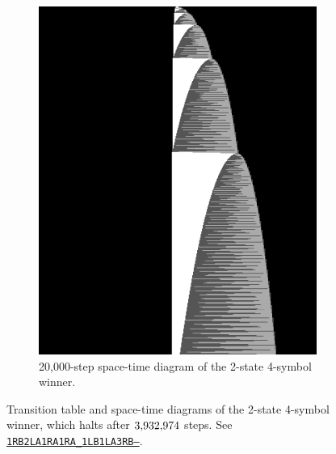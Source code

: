 \begin{figure}[ht]
\begin{subfigure}[b]{0.32\textwidth}
        \includegraphics[width=\linewidth]{figures/space-time-diagrams/bb2x4_20k.png}
        \caption{20,000-step space-time diagram of the 2-state 4-symbol winner.}
        \label{fig:bb2x4-diagram-zoomout}
    \end{subfigure}

    \caption{Transition table and space-time diagrams of the 2-state 4-symbol \BBfull winner, which halts after $3{,}932{,}974$ steps. See
        \href{https://bbchallenge.org/1RB2LA1RA1RA_1LB1LA3RB---}{\texttt{1RB2LA1RA1RA\_1LB1LA3RB---}}.}
    \label{fig:bb2x4}
\end{figure}